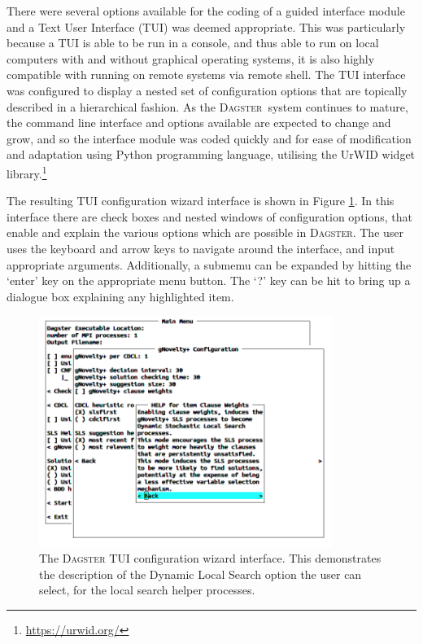 \documentclass[10pt,a4paper,oneside,headinclude,footinclude,BCOR5mm]{scrartcl}
\newcommand{\dagster}{\textsc{Dagster}\xspace}
\begin{document}
There were several options available for the coding of a guided interface module and a Text User Interface (TUI) was deemed appropriate. This was particularly because a TUI is able to be run in a console, and thus able to run on local computers with and without graphical operating systems, it is also highly compatible with running on remote systems via remote shell.
The TUI interface was configured to display a nested set of configuration options that are topically described in a hierarchical fashion.
As the \dagster\ system continues to mature, the command line interface and options available are expected to change and grow, and so the interface module was coded quickly and for ease of modification and adaptation using Python programming language, utilising the {\textsc UrWID} widget library.\footnote{\url{https://urwid.org/}}

The resulting TUI configuration wizard interface is shown in Figure \ref{fig:tui_wizard}.  
In this interface there are check boxes and nested windows of configuration options, that enable and explain the various options which are possible in \dagster.
The user uses the keyboard and arrow keys to navigate around the interface, and input appropriate arguments.
Additionally, a submemu can be expanded by hitting the `enter' key on the appropriate menu button.
The `?' key can be hit to bring up a dialogue box explaining any highlighted item.

\begin{figure}
\centering
\includegraphics[width=0.85\textwidth]{figs/tui2.png}
\caption[The \dagster TUI configuration wizard interface]{The \dagster TUI configuration wizard interface. This demonstrates the description of the Dynamic Local Search option the user can select, for the local search helper processes. }\label{fig:tui_wizard}
\end{figure}
\end{document}
